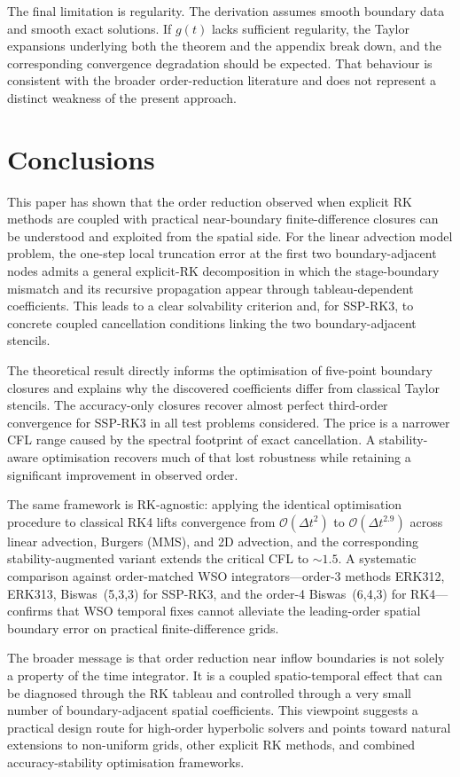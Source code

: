 \documentclass[review,hidelinks,onefignum,onetabnum]{siamart251216}
\newcommand{\Dt}{\Delta t}
\newcommand{\Order}[1]{\mathcal{O}\!\left(#1\right)}
\begin{document}
The final limitation is regularity. The derivation assumes smooth boundary data and smooth exact solutions. If $g(t)$ lacks sufficient regularity, the Taylor expansions underlying both the theorem and the appendix break down, and the corresponding convergence degradation should be expected. That behaviour is consistent with the broader order-reduction literature and does not represent a distinct weakness of the present approach.

\section{Conclusions}

This paper has shown that the order reduction observed when explicit RK methods are coupled with practical near-boundary finite-difference closures can be understood and exploited from the spatial side. For the linear advection model problem, the one-step local truncation error at the first two boundary-adjacent nodes admits a general explicit-RK decomposition in which the stage-boundary mismatch and its recursive propagation appear through tableau-dependent coefficients. This leads to a clear solvability criterion and, for SSP-RK3, to concrete coupled cancellation conditions linking the two boundary-adjacent stencils.

The theoretical result directly informs the optimisation of five-point boundary closures and explains why the discovered coefficients differ from classical Taylor stencils. The accuracy-only closures recover almost perfect third-order convergence for SSP-RK3 in all test problems considered. The price is a narrower CFL range caused by the spectral footprint of exact cancellation. A stability-aware optimisation recovers much of that lost robustness while retaining a significant improvement in observed order.

The same framework is RK-agnostic: applying the identical optimisation procedure to classical RK4 lifts convergence from $\Order{\Dt^2}$ to $\Order{\Dt^{2.9}}$ across linear advection, Burgers (MMS), and 2D advection, and the corresponding stability-augmented variant extends the critical CFL to ${\sim}1.5$. A systematic comparison against order-matched WSO integrators---order-3 methods ERK312, ERK313, Biswas~(5,3,3) for SSP-RK3, and the order-4 Biswas~(6,4,3) for RK4---confirms that WSO temporal fixes cannot alleviate the leading-order spatial boundary error on practical finite-difference grids.

The broader message is that order reduction near inflow boundaries is not solely a property of the time integrator. It is a coupled spatio-temporal effect that can be diagnosed through the RK tableau and controlled through a very small number of boundary-adjacent spatial coefficients. This viewpoint suggests a practical design route for high-order hyperbolic solvers and points toward natural extensions to non-uniform grids, other explicit RK methods, and combined accuracy-stability optimisation frameworks.
\end{document}
